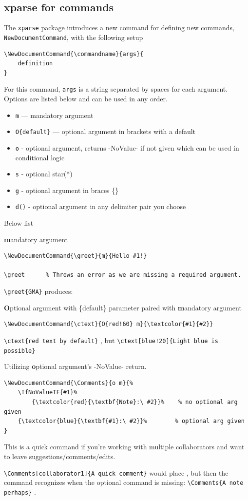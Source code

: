 \documentclass[]{article}
\begin{document}
\subsection{xparse for commands}
The \verb|xparse| package introduces a new command for defining new commands, \verb|NewDocumentCommand|, with the following setup
\begin{verbatim}
\NewDocumentCommand{\commandname}{args}{
    definition
}
\end{verbatim}
For this command, \verb|args| is a string separated by spaces for each argument. Options are listed below and can be used in any order.
\begin{itemize}
    \item \verb|m| — mandatory argument
    \item \verb|O{default}| — optional argument in brackets with a default
    \item \verb|o| - optional argument, returns -NoValue- if not given which can be used in conditional logic
    \item \verb|s| - optional star(*)
    \item \verb|g| - optional argument in braces \{\}
    \item \verb|d()| - optional argument in any delimiter pair you choose
\end{itemize}
Below list 
\begin{example}
\textbf{m}andatory argument
\begin{verbatim}
\NewDocumentCommand{\greet}{m}{Hello #1!}

\greet      % Throws an error as we are missing a required argument.
\end{verbatim}
\verb|\greet{GMA}| produces: 
\end{example}
\begin{example}
\textbf{O}ptional argument with \{default\} parameter paired with \textbf{m}andatory argument
\begin{verbatim}
\NewDocumentCommand{\ctext}{O{red!60} m}{\textcolor{#1}{#2}}
\end{verbatim}
\verb|\ctext{red text by default}| , but \verb|\ctext[blue!20]{Light blue is possible}| 
\end{example}
\begin{example}
Utilizing \textbf{o}ptional argument's -NoValue- return.
\begin{verbatim}
\NewDocumentCommand{\Comments}{o m}{%
    \IfNoValueTF{#1}%
        {\textcolor{red}{\textbf{Note}:\ #2}}%    % no optional arg given
    {\textcolor{blue}{\textbf{#1}:\ #2}}%        % optional arg given
}
\end{verbatim}
This is a quick command if you're working with multiple collaborators and want to leave suggestions/comments/edits.

\verb|\Comments[collaborator1]{A quick comment}| would place , but then the command recognizes when the optional command is missing: \verb|\Comments{A note perhaps}| .
\end{example}
\end{document}
